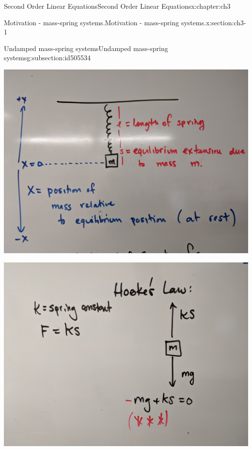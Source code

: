\documentclass[oneside,10pt,]{book}
\numberwithin{equation}{section}
\numberwithin{equation}{section}
\begin{document}
\begin{chapterptx}{Second Order Linear Equations}{}{Second Order Linear Equations}{}{}{x:chapter:ch3}
\begin{sectionptx}{Motivation - mass-spring systems.}{}{Motivation - mass-spring systems.}{}{}{x:section:ch3-1}
\begin{subsectionptx}{Undamped mass-spring systems}{}{Undamped mass-spring systems}{}{}{g:subsection:id505534}
\begin{image}{0}{1}{0}
\end{image}%
\begin{image}{0}{1}{0}%
\includegraphics[width=\linewidth]{images/spring_eq.jpg}
\end{image}%
\begin{image}{0}{1}{0}%
\includegraphics[width=\linewidth]{images/hookes.jpg}
\end{image}%
\begin{image}{0}{1}{0}%

\end{image}
\end{subsectionptx}
\end{sectionptx}
\end{chapterptx}
\end{document}
